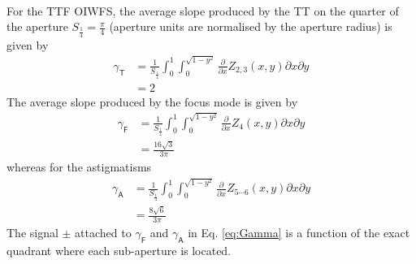 \documentclass[a4paper,12pt]{article}
\newcommand{\0}{\mathsf{0}} %
\begin{document}
\begin{align}
        \end{align}

For the TTF OIWFS, the average slope produced by the TT on
the quarter of the aperture $S_{\frac{1}{4}}=\frac{\pi}{4}$ (aperture units are normalised
by the aperture radius) is given by
\begin{align}\label{eq:pt}
  \gamma_\textsf{T}  & =
  \frac{1}{S_\frac{1}{4}}\int_0^1\int_0^{\sqrt{1-y^2}}
  \frac{\partial}{\partial x} Z_{2,3}
    (x,y) \partial x \partial y \\
    & = 2 \nonumber 
        \end{align}
The average slope produced by the focus mode is given by
\begin{align}\label{eq:pf}
  \gamma_\textsf{F}  & =
  \frac{1}{S_\frac{1}{4}}\int_0^1\int_0^{\sqrt{1-y^2}}
  \frac{\partial}{\partial x} Z_{4}
    (x,y) \partial x \partial y \\
    & = \frac{16\sqrt{3}}{3\pi} \nonumber 
        \end{align}
whereas for the astigmatisms 
\begin{align}\label{eq:pa}
  \gamma_\textsf{A}  & =
  \frac{1}{S_\frac{1}{4}}\int_0^1\int_0^{\sqrt{1-y^2}}
  \frac{\partial}{\partial x} Z_{5\cdots6}
    (x,y) \partial x \partial y \\
    & =  \frac{8\sqrt{6}}{3\pi} \nonumber 
  \end{align}
  The signal $\pm$ attached to
 $\gamma_\textsf{F}$ and $  \gamma_\textsf{A}$ in Eq. \eqref{eq:Gamma} is a function of
 the exact quadrant where each sub-aperture is located.
\end{document}
